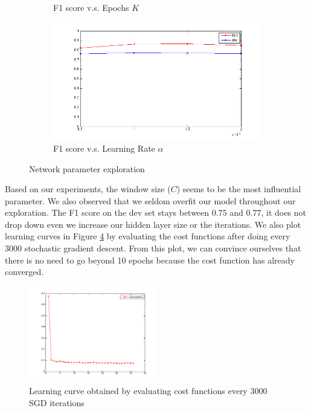 \documentclass[letterpaper]{article}
\begin{document}
\begin{figure}[ht]
\begin{subfigure}{.5\textwidth}
  \caption{F1 score v.s. Epochs $K$}
  \label{fig:epoch}
\end{subfigure}%
\begin{subfigure}{.5\textwidth}
  \includegraphics[scale=0.5, width=1.0\linewidth]{alpha.png}
  \caption{F1 score v.s. Learning Rate $\alpha$}
  \label{fig:alpha}
\end{subfigure}
\caption{Network parameter exploration}
\label{fig:exploration}
\end{figure}
Based on our experiments, the window size ($C$) seems to be the most influential parameter. We also observed that we seldom overfit our model throughout our exploration. The F1 score on the dev set stays between $0.75$ and $0.77$, it does not drop down even we increase our hidden layer size or the iterations. We also plot learning curves in Figure \ref{fig:learning_curve} by evaluating the cost functions after doing every $3000$ stochastic gradient descent. From this plot, we can convince ourselves that there is no need to go beyond 10 epochs because the cost function has already converged.
\begin{figure}[ht]
\begin{center}
\includegraphics[width=0.5\textwidth]{curve.png}
\caption{Learning curve obtained by evaluating cost functions every $3000$ SGD iterations}
\label{fig:learning_curve}
\end{center}
\end{figure}
\end{document}
